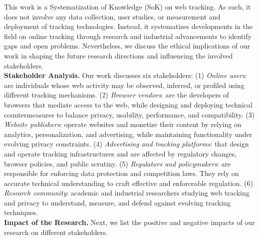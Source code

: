 \label{sec:ethics-considerations}

This work is a Systematization of Knowledge (SoK) on web tracking.
%
As such, it does not involve any data collection, user studies, or measurement and deployment of tracking technologies.
%
Instead, it systematizes developments in the field on online tracking through research and industrial advancements to identify gaps and open problems.
%
Nevertheless, we discuss the ethical implications of our work in shaping the future research directions and influencing the involved stakeholders.\\
%

\noindent \textbf{Stakeholder Analysis.}
%
Our work discusses six stakeholders:
%
(1) \textit{Online users}:
%
are individuals whose web activity may be observed, inferred, or profiled using different tracking mechanisms.
%
(2) \textit{Browser vendors}:
%
are the developers of browsers that mediate access to the web, while designing and deploying technical countermeasures to balance privacy, usability, performance, and compatibility.
%
(3) \textit{Website publishers}:
%
operate websites and monetize their content by relying on analytics, personalization, and advertising, while maintaining functionality under evolving privacy constraints.
%
(4) \textit{Advertising and tracking platforms}:
%
that design and operate tracking infrastructures and are affected by regulatory changes, browser policies, and public scrutiny.
%
(5) \textit{Regulators and policymakers}:
%
are responsible for enforcing data protection and competition laws. They rely on accurate technical understanding to craft effective and enforceable regulation.
%
(6) \textit{Research community}:
%
academic and industrial researchers studying web tracking and privacy to understand, measure, and defend against evolving tracking techniques.\\

\noindent \textbf{Impact of the Research.}
%
Next, we list the positive and negative impacts of our research on different stakeholders.

